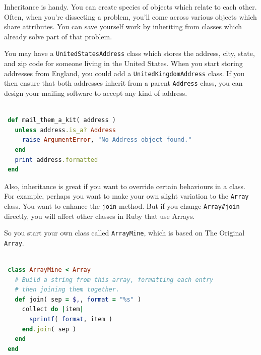 \documentclass[10pt,twoside]{report}
\begin{document}
Inheritance is handy.  You can create species of objects which relate
to each other. Often, when you're dissecting a problem, you'll come
across various objects which share attributes.  You can save yourself
work by inheriting from classes which already solve part of that
problem.

You may have a \lstinline[breaklines=true]|UnitedStatesAddress| class
which stores the address, city, state, and zip code for someone living
in the United States.  When you start storing addresses from England,
you could add a \lstinline[breaklines=true]|UnitedKingdomAddress|
class.  If you then ensure that both addresses inherit from a parent
\lstinline[breaklines=true]|Address| class, you can design your
mailing software to accept any kind of address.


\begin{lstlisting}[basicstyle=\ttfamily\color{basiccolor},
    commentstyle = \ttfamily\color{commentcolor},
    keywordstyle=\ttfamily\color{keywordscolor},
    stringstyle=\color{stringcolor},
    language=Ruby,
    basicstyle=\small\ttfamily,
    showstringspaces=false,
  ]

 def mail_them_a_kit( address )
   unless address.is_a? Address
     raise ArgumentError, "No Address object found."
   end
   print address.formatted
 end

\end{lstlisting}


Also, inheritance is great if you want to override certain behaviours
in a class. For example, perhaps you want to make your own slight
variation to the \lstinline[breaklines=true]|Array| class. You want to
enhance the \lstinline[breaklines=true]|join| method.  But if you
change \lstinline[breaklines=true]|Array#join| directly, you will
affect other classes in Ruby that use Arrays.

So you start your own class called
\lstinline[breaklines=true]|ArrayMine|, which is based on The Original
\lstinline[breaklines=true]|Array|.


\begin{lstlisting}[basicstyle=\ttfamily\color{basiccolor},
    commentstyle = \ttfamily\color{commentcolor},
    keywordstyle=\ttfamily\color{keywordscolor},
    stringstyle=\color{stringcolor},
    language=Ruby,
    basicstyle=\small\ttfamily,
    showstringspaces=false,
  ]

 class ArrayMine < Array
   # Build a string from this array, formatting each entry
   # then joining them together.
   def join( sep = $,, format = "%s" )
     collect do |item|
       sprintf( format, item )
     end.join( sep )
   end
 end

\end{lstlisting}
\end{document}
